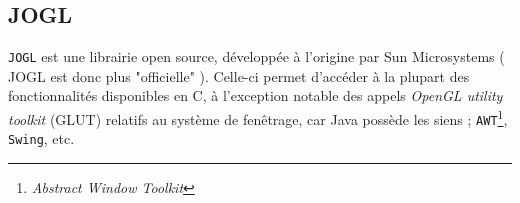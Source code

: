 \documentclass[11pt]{report}
\begin{document}

\subsection{JOGL}
 \texttt{JOGL} est une librairie open source, développée à l'origine par Sun Microsystems ( JOGL est donc plus "officielle" ).
Celle-ci permet d'accéder à la plupart des fonctionnalités disponibles en C, à l'exception notable des appels \textit{OpenGL utility toolkit} (GLUT) relatifs au système de fenêtrage, car Java possède les siens ;  \texttt{AWT}\footnote{\textit{Abstract Window Toolkit}}, \texttt{Swing}, etc.
\end{document}
